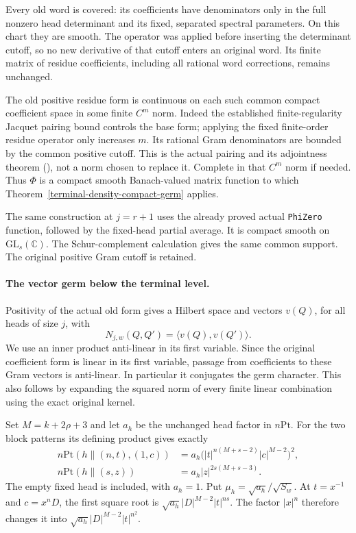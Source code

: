 Every old word is covered: its coefficients have denominators only
in the full nonzero head determinant and its fixed, separated
spectral parameters.  On this chart they are smooth.  The operator
was applied before inserting the determinant cutoff, so no new
derivative of that cutoff enters an original word.  Its finite
matrix of residue coefficients, including all rational word
corrections, remains unchanged.

The old positive residue form is continuous on each such common
compact coefficient space in some finite $C^m$ norm.  Indeed the
established finite-regularity Jacquet pairing bound controls the
base form; applying the fixed finite-order residue operator only
increases $m$.  Its rational Gram denominators are bounded by the
common positive cutoff.  This is the actual pairing and its
adjointness theorem (\JacquetUnfoldingReference), not a norm chosen
to replace it.  Complete in that $C^m$ norm if needed.  Thus
$\Phi$ is a compact smooth Banach-valued matrix function to which
Theorem~\ref{terminal-density-compact-germ} applies.

The same construction at $j=r+1$ uses the already proved actual
\texttt{PhiZero} function, followed by the fixed-head partial
average.  It is compact smooth on $\mathrm{GL}_s(\mathbb C)$.
The Schur-complement calculation gives the same common support.
The original positive Gram cutoff is retained.

\paragraph{The vector germ below the terminal level.}
Positivity of the actual old form gives a Hilbert space and vectors
$v(Q)$, for all heads of size $j$, with
\begin{equation}\label{block-growth-low-gram}
                    N_{j,w}(Q,Q')=\langle v(Q),v(Q')\rangle.
\end{equation}
We use an inner product anti-linear in its first variable.
Since the original coefficient form is linear in its first
variable, passage from coefficients to these Gram vectors is
anti-linear.  In particular it conjugates the germ character.
This also follows by expanding the squared norm of every finite
linear combination using the exact original kernel.

Set $M=k+2\rho+3$ and let $a_h$ be the unchanged head factor in
$n\mathrm{Pt}$.  For the two block patterns its defining product
gives exactly
\begin{align*}
 n\mathrm{Pt}(h\mathbin{\|}(n,t),(1,c))
    &=a_h\bigl(|t|^{n(M+s-2)}|c|^{M-2}\bigr)^2,\\
 n\mathrm{Pt}(h\mathbin{\|}(s,z))
    &=a_h|z|^{2s(M+s-3)}.
\end{align*}
The empty fixed head is included, with $a_h=1$.
Put $\mu_h=\sqrt{a_h}/\sqrt{S_w}$.  At $t=x^{-1}$ and
$c=x^nD$, the first square root is
$\sqrt{a_h}|D|^{M-2}|t|^{ns}$.  The factor
$|x|^n$ therefore changes it into
$\sqrt{a_h}|D|^{M-2}|t|^{n^2}$.


